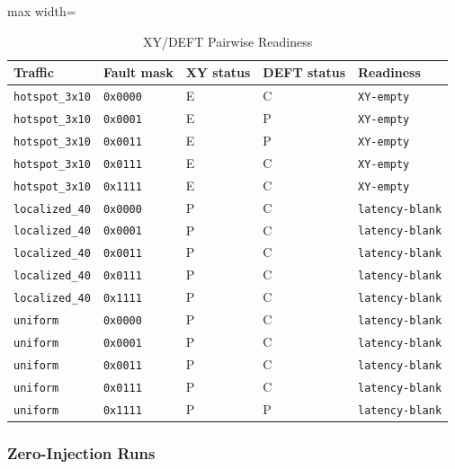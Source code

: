 \documentclass[conference]{IEEEtran}
\begin{document}
\begin{table}[t]
\centering
\caption{XY/DEFT Pairwise Readiness}
\label{tab:pair_readiness}
\scriptsize
\begin{adjustbox}{max width=\textwidth}
\begin{tabular}{@{}lllll@{}}
\toprule
\textbf{Traffic} & \textbf{Fault mask} & \textbf{XY status} & \textbf{DEFT status} & \textbf{Readiness} \\
\midrule
\texttt{hotspot\_3x10} & \texttt{0x0000} & E & C & \texttt{XY-empty} \\
\texttt{hotspot\_3x10} & \texttt{0x0001} & E & P & \texttt{XY-empty} \\
\texttt{hotspot\_3x10} & \texttt{0x0011} & E & P & \texttt{XY-empty} \\
\texttt{hotspot\_3x10} & \texttt{0x0111} & E & C & \texttt{XY-empty} \\
\texttt{hotspot\_3x10} & \texttt{0x1111} & E & C & \texttt{XY-empty} \\
\texttt{localized\_40} & \texttt{0x0000} & P & C & \texttt{latency-blank} \\
\texttt{localized\_40} & \texttt{0x0001} & P & C & \texttt{latency-blank} \\
\texttt{localized\_40} & \texttt{0x0011} & P & C & \texttt{latency-blank} \\
\texttt{localized\_40} & \texttt{0x0111} & P & C & \texttt{latency-blank} \\
\texttt{localized\_40} & \texttt{0x1111} & P & C & \texttt{latency-blank} \\
\texttt{uniform} & \texttt{0x0000} & P & C & \texttt{latency-blank} \\
\texttt{uniform} & \texttt{0x0001} & P & C & \texttt{latency-blank} \\
\texttt{uniform} & \texttt{0x0011} & P & C & \texttt{latency-blank} \\
\texttt{uniform} & \texttt{0x0111} & P & C & \texttt{latency-blank} \\
\texttt{uniform} & \texttt{0x1111} & P & P & \texttt{latency-blank} \\
\bottomrule
\end{tabular}
\end{adjustbox}
\end{table}

\subsubsection{Zero-Injection Runs}
\end{document}
